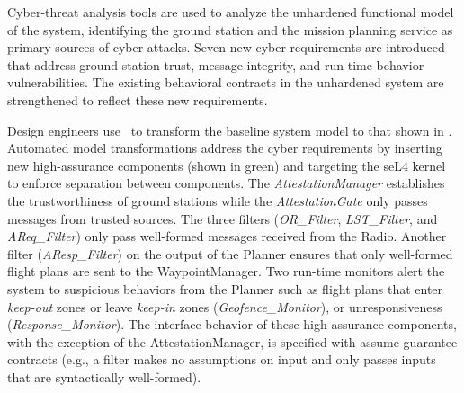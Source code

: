 %
Cyber-threat analysis tools are used to analyze the unhardened functional model of the system, 
identifying the ground station and the mission planning
service as primary sources of cyber attacks.
Seven new cyber requirements are introduced that address ground station trust, message integrity, and run-time behavior vulnerabilities.
The existing behavioral contracts in the unhardened system are strengthened to reflect these new requirements.

Design engineers use \briefcase\ to transform the baseline system model to that shown in
.  Automated model transformations address the cyber requirements by inserting  
new high-assurance components (shown in green) and targeting the seL4 kernel to enforce separation between components.
The \emph{AttestationManager} establishes the trustworthiness of ground stations while
the \emph{AttestationGate} only passes messages from trusted sources.  The three 
filters  (\emph{OR\_Filter}, \emph{LST\_Filter}, and \emph{AReq\_Filter}) 
only pass well-formed messages received from the Radio. Another filter (\emph{AResp\_Filter}) on the output of the Planner ensures 
that only well-formed flight plans are sent to the WaypointManager.  
Two run-time monitors alert the system to suspicious behaviors from the Planner such as flight plans that enter \textit{keep-out} zones or leave
\textit{keep-in} zones (\emph{Geofence\_Monitor}), or unresponsiveness (\emph{Response\_Monitor}).
The interface behavior of these high-assurance components, with the exception of the AttestationManager, is
specified with assume-guarantee contracts (e.g., a filter makes no assumptions on input and only
passes inputs that are syntactically well-formed).

